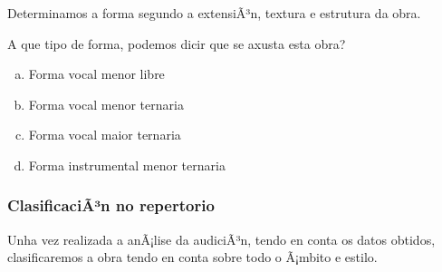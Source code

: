 \begin{multicols}{2}
\begin{enumerate}[1.-]
        Determinamos a forma segundo a extensiÃ³n, textura e estrutura da obra. \\ 
        \par %
        A que tipo de forma, podemos dicir que se axusta esta obra?
        \begin{enumerate}[a)]
            \item 
            Forma vocal menor libre
            \item
            Forma vocal menor ternaria
            \item
            Forma vocal maior ternaria
            \item
            Forma instrumental menor ternaria
        \end{enumerate}
        \end{enumerate}
%
\end{multicols}
%
\subsubsection*{ClasificaciÃ³n no repertorio} 
Unha vez realizada a anÃ¡lise da audiciÃ³n, tendo en conta os datos obtidos, clasificaremos a obra tendo en conta sobre todo o Ã¡mbito e estilo.
%
%
\vspace*{0.5cm}
\begin{ejercicio}

%

        \vspace*{2.78cm}
\end{ejercicio}

